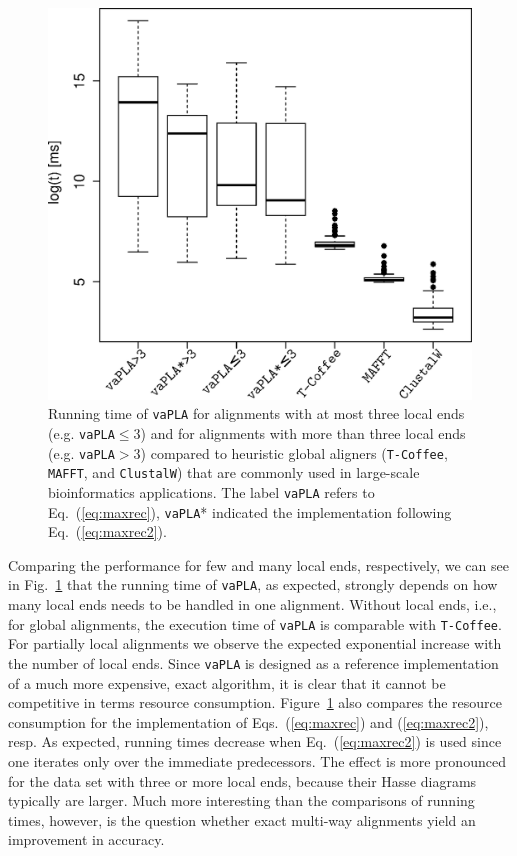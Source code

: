 \documentclass[a4paper,10pt]{article}
\newcommand{\TODO}[1]{\begingroup\color{red}#1\endgroup}
\newcommand{\SAFTWARE}{\texttt{vaPLA}} %
\begin{document}
\begin{figure}
  \begin{center}
    \includegraphics[width=1\columnwidth]{times_Var_endSep.eps}
  \end{center}
  \caption{Running time of \SAFTWARE{} for alignments with at most three
    local ends (e.g. \SAFTWARE$\le3$) and for alignments with more than three
    local ends (e.g. \SAFTWARE$>3$) compared to heuristic global aligners
    (\texttt{T-Coffee}, \texttt{MAFFT}, and \texttt{ClustalW}) that are
    commonly used in large-scale bioinformatics applications. The
      label \SAFTWARE{} refers to Eq.~(\ref{eq:maxrec}),  \SAFTWARE{}*
      indicated the implementation following Eq.~(\ref{eq:maxrec2}).}
  \label{fig:manyLoc}
\end{figure}

Comparing the performance for few and many local ends, respectively, we can
see in Fig.~\ref{fig:manyLoc} that the running time of \SAFTWARE, as
expected, strongly depends on how many local ends needs to be handled in
one alignment. Without local ends, i.e., for global alignments, the
execution time of \SAFTWARE{} is comparable with \texttt{T-Coffee}. For
partially local alignments we observe the expected exponential increase
with the number of local ends. Since \SAFTWARE{} is designed as a reference
implementation of a much more expensive, exact algorithm, it is clear that
it cannot be competitive in terms resource consumption.
Figure~\ref{fig:manyLoc} also compares the resource consumption for the
implementation of Eqs.~(\ref{eq:maxrec}) and (\ref{eq:maxrec2}), resp.  As
expected, running times decrease when Eq.~(\ref{eq:maxrec2}) is used
  since one iterates only over the immediate predecessors. The effect is
  more pronounced for the data set with three or more local ends, because
  their Hasse diagrams typically are larger.  Much more interesting than
the comparisons of running times, however, is the question whether exact
multi-way alignments yield an improvement in accuracy.
\end{document}
